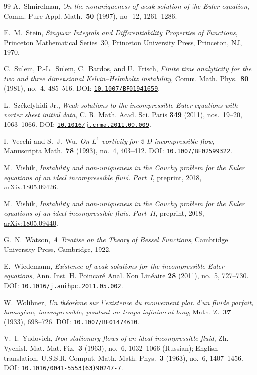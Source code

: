 \documentclass[11pt,a4paper,reqno]{amsart}
\theoremstyle{plain}
\theoremstyle{definition}
\theoremstyle{remark}
\numberwithin{equation}{section}
\newcommand{\doi}[1]{\href{https://doi.org/#1}{\nolinkurl{#1}}}
\begin{document}
\begin{thebibliography}{99}
A.~Shnirelman,
\emph{On the nonuniqueness of weak solution of the Euler equation},
Comm. Pure Appl. Math.\ \textbf{50} (1997), no.~12, 1261--1286.

E.~M.~Stein,
\emph{Singular Integrals and Differentiability Properties of Functions},
Princeton Mathematical Series~30, Princeton University Press, Princeton, NJ, 1970.

C.~Sulem, P.-L.~Sulem, C.~Bardos, and U.~Frisch,
\emph{Finite time analyticity for the two and three dimensional Kelvin--Helmholtz instability},
Comm. Math. Phys.\ \textbf{80} (1981), no.~4, 485--516.
DOI: \doi{10.1007/BF01941659}.

L.~Sz\'ekelyhidi Jr.,
\emph{Weak solutions to the incompressible Euler equations with vortex sheet initial data},
C. R. Math. Acad. Sci. Paris \textbf{349} (2011), nos.~19--20, 1063--1066.
DOI: \doi{10.1016/j.crma.2011.09.009}.

I.~Vecchi and S.~J.~Wu,
\emph{On $L^1$-vorticity for 2-D incompressible flow},
Manuscripta Math.\ \textbf{78} (1993), no.~4, 403--412.
DOI: \doi{10.1007/BF02599322}.

M.~Vishik,
\emph{Instability and non-uniqueness in the Cauchy problem for the Euler equations of an ideal incompressible fluid. Part~I},
preprint, 2018, \href{https://arxiv.org/abs/1805.09426}{arXiv:1805.09426}.

M.~Vishik,
\emph{Instability and non-uniqueness in the Cauchy problem for the Euler equations of an ideal incompressible fluid. Part~II},
preprint, 2018, \href{https://arxiv.org/abs/1805.09440}{arXiv:1805.09440}.

G.~N.~Watson,
\emph{A Treatise on the Theory of Bessel Functions},
Cambridge University Press, Cambridge, 1922.

E.~Wiedemann,
\emph{Existence of weak solutions for the incompressible Euler equations},
Ann. Inst. H. Poincar\'e Anal. Non Lin\'eaire \textbf{28} (2011), no.~5, 727--730.
DOI: \doi{10.1016/j.anihpc.2011.05.002}.

W.~Wolibner,
\emph{Un th\'eor\`eme sur l'existence du mouvement plan d'un fluide parfait, homog\`ene, incompressible, pendant un temps infiniment long},
Math. Z.\ \textbf{37} (1933), 698--726.
DOI: \doi{10.1007/BF01474610}.

V.~I.~Yudovich,
\emph{Non-stationary flows of an ideal incompressible fluid},
Zh. Vychisl. Mat. Mat. Fiz.\ \textbf{3} (1963), no.~6, 1032--1066 (Russian);
English translation, U.S.S.R. Comput. Math. Math. Phys.\ \textbf{3} (1963), no.~6, 1407--1456.
DOI: \doi{10.1016/0041-5553(63)90247-7}.

\end{thebibliography}
\end{document}
